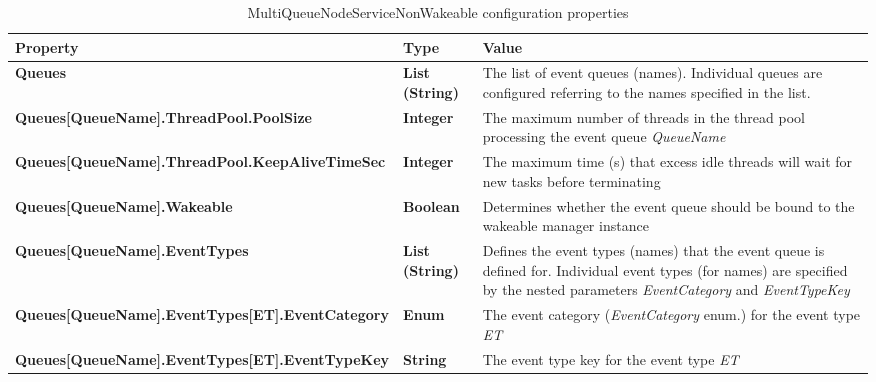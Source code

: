 \begin{table}
\scriptsize
\begin{center}
\begin{tabular}{p{6.3cm} p{0.9cm} p{7.3cm}}
	\hline
	\textbf{Property}											& \textbf{Type}						& \textbf{Value}					\\[1mm]
    \hline
	\textbf{Queues}												& \textbf{List (String)}			& The list of event queues (names). Individual queues are configured referring to the names specified in the list.		\\[1.5mm]	
	\textbf{Queues[QueueName].ThreadPool.PoolSize}				& \textbf{Integer}					& The maximum number of threads in the thread pool processing the event queue \emph{QueueName}		\\[1.5mm]	
	\textbf{Queues[QueueName].ThreadPool.KeepAliveTimeSec}		& \textbf{Integer}					& The maximum time (s) that excess idle threads will wait for new tasks before terminating			\\[1.5mm]	
	\textbf{Queues[QueueName].Wakeable}							& \textbf{Boolean}					& Determines whether the event queue should be bound to the wakeable manager instance					\\[1.5mm]	
	\textbf{Queues[QueueName].EventTypes}						& \textbf{List (String)}			& Defines the event types (names) that the event queue is defined for. Individual event types (for names) are specified by the nested parameters \emph{EventCategory} and \emph{EventTypeKey}			\\[1.5mm]	
	\textbf{Queues[QueueName].EventTypes[ET].EventCategory}		& \textbf{Enum}						& The event category (\emph{EventCategory} enum.) for the event type \emph{ET}						\\[1.5mm]	
	\textbf{Queues[QueueName].EventTypes[ET].EventTypeKey}		& \textbf{String}					& The event type key for the event type \emph{ET}						\\[1.5mm]	
    \hline
\end{tabular}
\end{center}
\caption{MultiQueueNodeServiceNonWakeable configuration properties}
\label{tab:libMultiQueueNodeServiceNonWakeable}
\end{table}



